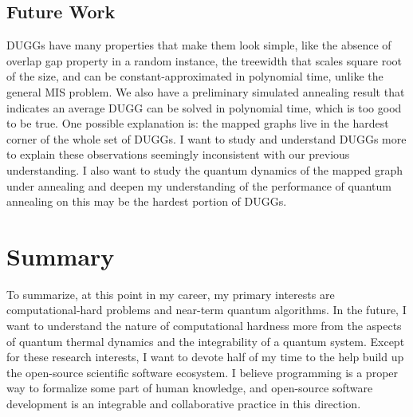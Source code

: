 \documentclass[a4paper]{article}
\newcommand{\<}{\langle}
\renewcommand{\>}{\rangle}
\begin{document}
\subsection{Future Work}

DUGGs have many properties that make them look simple, like the absence of overlap gap property in a random instance, the treewidth that scales square root of the size, and can be constant-approximated in polynomial time, unlike the general MIS problem.
We also have a preliminary simulated annealing result that indicates an average DUGG can be solved in polynomial time, which is too good to be true.
One possible explanation is: the mapped graphs live in the hardest corner of the whole set of DUGGs.
I want to study and understand DUGGs more to explain these observations seemingly inconsistent with our previous understanding.
I also want to study the quantum dynamics of the mapped graph under annealing and deepen my understanding of the performance of quantum annealing on this may be the hardest portion of DUGGs.

\section{Summary}
To summarize, at this point in my career, my primary interests are computational-hard problems and near-term quantum algorithms.
In the future, I want to understand the nature of computational hardness more from the aspects of quantum thermal dynamics and the integrability of a quantum system.
Except for these research interests, I want to devote half of my time to the help build up the open-source scientific software ecosystem.
I believe programming is a proper way to formalize some part of human knowledge, and open-source software development is an integrable and collaborative practice in this direction.


\end{document}
